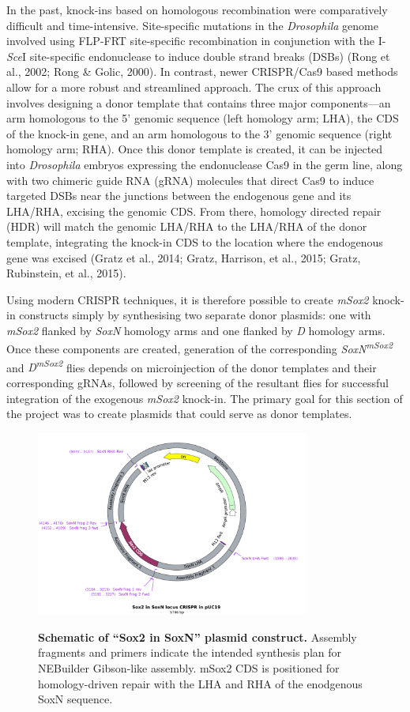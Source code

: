 \documentclass[withindex,glossary]{cam-thesis}
\begin{document}
In the past, knock-ins based on homologous recombination were
comparatively difficult and time-intensive. Site-specific mutations in
the \emph{Drosophila} genome involved using FLP-FRT site-specific
recombination in conjunction with the I-\emph{Sce}I site-specific
endonuclease to induce double strand breaks (\gls{DSBs}) (Rong et al., 2002;
Rong \& Golic, 2000). In contrast, newer CRISPR/Cas9 based methods allow
for a more robust and streamlined approach. The crux of this approach
involves designing a donor template that contains three major
components---an arm homologous to the 5' genomic sequence (left homology
arm; LHA), the CDS of the knock-in gene, and an arm homologous to the 3'
genomic sequence (right homology arm; \gls{RHA}). Once this donor template is
created, it can be injected into \emph{Drosophila} embryos expressing
the endonuclease Cas9 in the germ line, along with two chimeric guide
RNA (\gls{gRNA}) molecules that direct Cas9 to induce targeted DSBs near the
junctions between the endogenous gene and its LHA/RHA, excising the
genomic CDS. From there, homology directed repair (\gls{HDR}) will match the
genomic LHA/RHA to the LHA/RHA of the donor template, integrating the
knock-in CDS to the location where the endogenous gene was excised
(Gratz et al., 2014; Gratz, Harrison, et al., 2015; Gratz, Rubinstein,
et al., 2015).

Using modern CRISPR techniques, it is therefore possible to create
\emph{mSox2} knock-in constructs simply by synthesising two separate
donor plasmids: one with \emph{mSox2} flanked by \emph{SoxN} homology
arms and one flanked by \emph{D} homology arms. Once these components
are created, generation of the corresponding
\emph{SoxN\textsuperscript{mSox2}} and \emph{D\textsuperscript{mSox2}}
flies depends on microinjection of the donor templates and their
corresponding gRNAs, followed by screening of the resultant flies for
successful integration of the exogenous \emph{mSox2} knock-in. The
primary goal for this section of the project was to create plasmids that
could serve as donor templates.

\setcounter{figure}{4-1}
\begin{figure}[htbp]
\centering
\includegraphics[width=0.8\textwidth]{Fig4_Sox2 in SoxN locus CRISPR in pUC19 Map}
\label{fig4}
\caption{\textbf{Schematic of ``Sox2 in SoxN'' plasmid construct.} Assembly fragments and primers indicate the intended synthesis plan for NEBuilder Gibson-like assembly. mSox2 CDS is positioned for homology-driven repair with the LHA and RHA of the enodgenous SoxN sequence.}
\end{figure}
\end{document}
